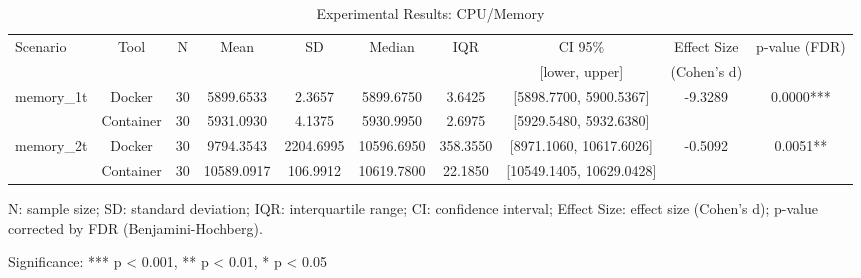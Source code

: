 \documentclass{article}
\begin{document}

\begin{table}[h]
\centering
\small
\caption{Experimental Results: CPU/Memory}
\label{tab:cpu_memory}
\begin{tabular}{lccccccccc}
\toprule
Scenario & Tool & N & Mean & SD & Median & IQR & CI 95\% & Effect Size & p-value (FDR) \\
 & & & & & & & [lower, upper] & (Cohen's d) & \\
\midrule
\multirow{2}{*}{memory\_1t} & Docker & 30 & 5899.6533 & 2.3657 & 5899.6750 & 3.6425 & [5898.7700, 5900.5367] & -9.3289 & 0.0000*** \\
 & Container & 30 & 5931.0930 & 4.1375 & 5930.9950 & 2.6975 & [5929.5480, 5932.6380] &  &  \\
\midrule
\multirow{2}{*}{memory\_2t} & Docker & 30 & 9794.3543 & 2204.6995 & 10596.6950 & 358.3550 & [8971.1060, 10617.6026] & -0.5092 & 0.0051** \\
 & Container & 30 & 10589.0917 & 106.9912 & 10619.7800 & 22.1850 & [10549.1405, 10629.0428] &  &  \\
\midrule
\bottomrule
\end{tabular}
\begin{tablenotes}
\small
\item N: sample size; SD: standard deviation; IQR: interquartile range; CI: confidence interval; Effect Size: effect size (Cohen's d); p-value corrected by FDR (Benjamini-Hochberg).
\item Significance: *** p < 0.001, ** p < 0.01, * p < 0.05
\end{tablenotes}
\end{table}
\end{document}
